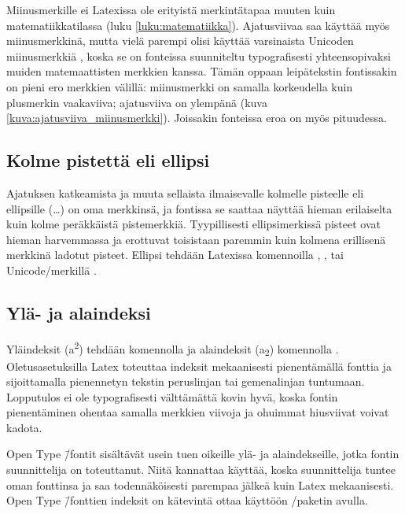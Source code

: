 Miinusmerkille ei Latexissa ole erityistä merkintätapaa muuten kuin
matematiikkatilassa (luku \ref{luku:matematiikka}). Ajatusviivaa saa
käyttää myös miinusmerkkinä, mutta vielä parempi olisi käyttää
varsinaista Unicoden miinusmerkkiä , koska
se on fonteissa suunniteltu typografisesti yhteensopivaksi muiden
matemaattisten merkkien kanssa. Tämän oppaan leipätekstin fontissakin on
pieni ero merkkien välillä: miinusmerkki on samalla korkeudella kuin
plusmerkin vaakaviiva; ajatusviiva on ylempänä (kuva
\ref{kuva:ajatusviiva_miinusmerkki}). Joissakin fonteissa eroa on myös
pituudessa.


\subsection{Kolme pistettä eli ellipsi}

Ajatuksen katkeamista ja muuta sellaista ilmaisevalle kolmelle pisteelle
eli ellipsille (\ldots) on oma merkkinsä, ja fontissa se saattaa näyttää
hieman erilaiselta kuin kolme peräkkäistä pistemerkkiä. Tyypillisesti
ellipsimerkissä pisteet ovat hieman harvemmassa ja erottuvat toisistaan
paremmin kuin kolmena erillisenä merkkinä ladotut pisteet. Ellipsi
tehdään Latexissa komennoilla , ,
 tai Unicode\-/merkillä .

\subsection{Ylä- ja alaindeksi}

Yläindeksit (a\textsuperscript{2}) tehdään komennolla  ja alaindeksit (a\textsubscript{2}) komennolla
. Oletusasetuksilla Latex toteuttaa
indeksit mekaanisesti pienentämällä fonttia ja sijoittamalla pienennetyn
tekstin peruslinjan tai gemenalinjan tuntumaan. Lopputulos ei ole
typografisesti välttämättä kovin hyvä, koska fontin pienentäminen
ohentaa samalla merkkien viivoja ja ohuimmat hiusviivat voivat kadota.

Open Type \=/fontit sisältävät usein tuen oikeille ylä- ja
alaindekseille, jotka fontin suunnittelija on toteuttanut. Niitä
kannattaa käyttää, koska suunnittelija tuntee oman fonttinsa ja saa
todennäköisesti parempaa jälkeä kuin Latex mekaanisesti. Open Type
\=/fonttien indeksit on kätevintä ottaa käyttöön
\-/paketin avulla.


